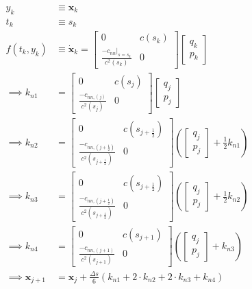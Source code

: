 \documentclass{article}
\begin{document}
\begin{align*}
  y_{k}&\equiv\bm{x}_k\\ 
  t_k&\equiv s_k \\
  f(t_k, y_k)&\equiv\dot{\bm{x}}_k=\begin{bmatrix} 0 & c(s_k) \\ \frac{-c_{nn}|_{s=s_k}}{c^2(s_k)} & 0\end{bmatrix}\begin{bmatrix} q_k \\ p_k\end{bmatrix} \\ 
  \implies k_{n1} &= \begin{bmatrix} 0 & c(s_j) \\ \frac{-c_{nn, (j)}}{c^2(s_j)} & 0\end{bmatrix}\begin{bmatrix} q_j \\ p_j\end{bmatrix} \\
  \implies k_{n2} &= \begin{bmatrix} 0 & c(s_{j+\frac{1}{2}}) \\ \frac{-c_{nn, (j+\frac{1}{2})}}{c^2(s_{j + \frac{1}{2}})} & 0\end{bmatrix}\left(\begin{bmatrix} q_j \\ p_j\end{bmatrix} + \frac{1}{2}k_{n1} \right) \\
  \implies k_{n3} &= \begin{bmatrix} 0 & c(s_{j+\frac{1}{2}}) \\ \frac{-c_{nn, (j+\frac{1}{2})}}{c^2(s_{j + \frac{1}{2}})} & 0\end{bmatrix}\left(\begin{bmatrix} q_j \\ p_j\end{bmatrix} + \frac{1}{2}k_{n2} \right) \\
  \implies k_{n4} &= \begin{bmatrix} 0 & c(s_{j+1}) \\ \frac{-c_{nn, (j+1)}}{c^2(s_{j + 1})} & 0\end{bmatrix}\left(\begin{bmatrix} q_j \\ p_j\end{bmatrix} + k_{n3} \right) \\
  \implies \bm{x}_{j+1} &= \bm{x}_{j} + \frac{\Delta s}{6}\left(k_{n1} + 2\cdot k_{n2} + 2\cdot k_{n3} + k_{n4} \right)
\end{align*}
\end{document}
